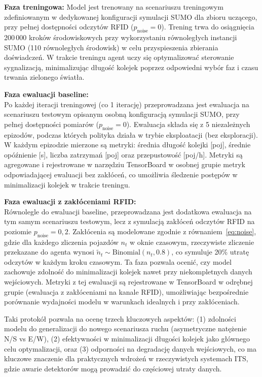 \documentclass[10pt,a4paper]{article}
\begin{document}
\textbf{Faza treningowa:} Model jest trenowany na scenariuszu treningowym zdefiniowanym w dedykowanej konfiguracji symulacji SUMO dla zbioru uczącego, przy pełnej dostępności odczytów RFID ($p_{\text{noise}} = 0$). Trening trwa do osiągnięcia 200\,000 kroków środowiskowych przy wykorzystaniu równoległych instancji SUMO (110 równoległych środowisk) w celu przyspieszenia zbierania doświadczeń. W trakcie treningu agent uczy się optymalizować sterowanie sygnalizacją, minimalizując długość kolejek poprzez odpowiedni wybór faz i czasu trwania zielonego światła.

\textbf{Faza ewaluacji baseline:}\\
Po każdej iteracji treningowej (co 1 iterację) przeprowadzana jest ewaluacja na scenariuszu testowym opisanym osobną konfiguracją symulacji SUMO, przy pełnej dostępności pomiarów ($p_{\text{noise}} = 0$). Ewaluacja składa się z 5 niezależnych epizodów, podczas których polityka działa w trybie eksploatacji (bez eksploracji). W każdym epizodzie mierzone są metryki: średnia długość kolejki [poj], średnie opóźnienie [s], liczba zatrzymań [poj] oraz przepustowość [poj/h]. Metryki są agregowane i rejestrowane w narzędziu TensorBoard w osobnej grupie metryk odpowiadającej ewaluacji bez zakłóceń, co umożliwia śledzenie postępów w minimalizacji kolejek w trakcie treningu.

\textbf{Faza ewaluacji z zakłóceniami RFID:}\\
Równolegle do ewaluacji baseline, przeprowadzana jest dodatkowa ewaluacja na tym samym scenariuszu testowym, lecz z symulacją zakłóceń odczytów RFID na poziomie $p_{\text{noise}} = 0{,}2$. Zakłócenia są modelowane zgodnie z równaniem~\eqref{eq:noise}, gdzie dla każdego zliczenia pojazdów $n_t$ w oknie czasowym, rzeczywiste zliczenie przekazane do agenta wynosi $\tilde{n}_t \sim \text{Binomial}(n_t, 0.8)$, co symuluje 20\% utratę odczytów w każdym kroku czasowym. Ta faza pozwala ocenić, czy model zachowuje zdolność do minimalizacji kolejek nawet przy niekompletnych danych wejściowych. Metryki z tej ewaluacji są rejestrowane w TensorBoard w odrębnej grupie (ewaluacja z zakłóceniami na kanale RFID), umożliwiając bezpośrednie porównanie wydajności modelu w warunkach idealnych i przy zakłóceniach.

Taki protokół pozwala na ocenę trzech kluczowych aspektów: (1) zdolności modelu do generalizacji do nowego scenariusza ruchu (asymetryczne natężenie N/S vs E/W), (2) efektywności w minimalizacji długości kolejek jako głównego celu optymalizacji, oraz (3) odporności na degradację danych wejściowych, co ma kluczowe znaczenie dla praktycznych wdrożeń w rzeczywistych systemach ITS, gdzie awarie detektorów mogą prowadzić do częściowej utraty danych.
\end{document}
